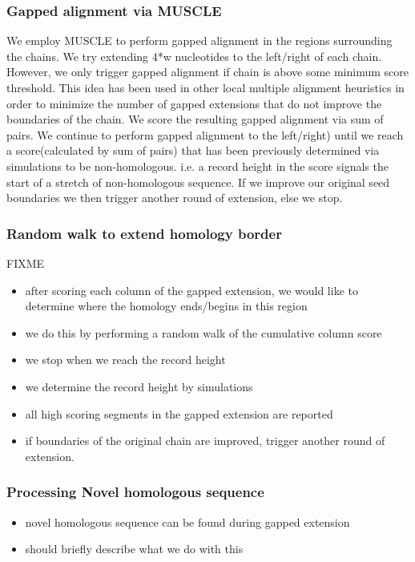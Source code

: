 \documentclass{llncs}
\begin{document}
\subsubsection{Gapped alignment via MUSCLE}
We employ MUSCLE to perform gapped alignment in the regions surrounding the chains. We try extending 4*w nucleotides to the left/right of each chain. However, we only trigger gapped alignment if chain is above some minimum score threshold. This idea has been used in other local multiple alignment heuristics in order to minimize the number of gapped extensions that do not improve the boundaries of the chain. We score the resulting gapped alignment via sum of pairs. We continue to perform gapped alignment to the left/right) until we reach a score(calculated by sum of pairs) that has been previously determined via simulations to be non-homologous. i.e. a record height in the score signals the start of a stretch of non-homologous sequence.  If we improve our original seed boundaries we then trigger another round of extension, else we stop. 


\subsubsection{Random walk to extend homology border}
FIXME
\begin{itemize}
\item after scoring each column of the gapped extension, we would like
to determine where the homology ends/begins in this region
\item we do this by performing a random walk of the cumulative column score
\item we stop when we reach the record height
\item we determine the record height by simulations
\item all high scoring segments in the gapped extension are reported
\item if boundaries of the original chain are improved, trigger another round of extension.
\end{itemize}

\subsubsection{Processing Novel homologous sequence}
\begin{itemize}
\item novel homologous sequence can be found during gapped extension
\item should briefly describe what we do with this
\end{itemize}
\end{document}
